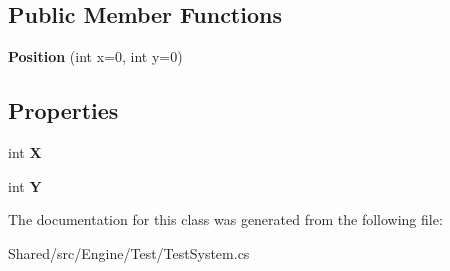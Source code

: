 \subsection*{Public Member Functions}
\begin{DoxyCompactItemize}
\item 
\hypertarget{class_midnight_blue_1_1_engine_1_1_testing_1_1_position_aa019a3b3a6f7089bbfb3049224de5bc0}{}\label{class_midnight_blue_1_1_engine_1_1_testing_1_1_position_aa019a3b3a6f7089bbfb3049224de5bc0} 
{\bfseries Position} (int x=0, int y=0)
\end{DoxyCompactItemize}
\subsection*{Properties}
\begin{DoxyCompactItemize}
\item 
\hypertarget{class_midnight_blue_1_1_engine_1_1_testing_1_1_position_a06c7181b32779edffecb1ea114212e13}{}\label{class_midnight_blue_1_1_engine_1_1_testing_1_1_position_a06c7181b32779edffecb1ea114212e13} 
int {\bfseries X}
\item 
\hypertarget{class_midnight_blue_1_1_engine_1_1_testing_1_1_position_a46eedf8fcbdc82189a9976b3444a9741}{}\label{class_midnight_blue_1_1_engine_1_1_testing_1_1_position_a46eedf8fcbdc82189a9976b3444a9741} 
int {\bfseries Y}
\end{DoxyCompactItemize}


The documentation for this class was generated from the following file\+:\begin{DoxyCompactItemize}
\item 
Shared/src/\+Engine/\+Test/Test\+System.\+cs\end{DoxyCompactItemize}

